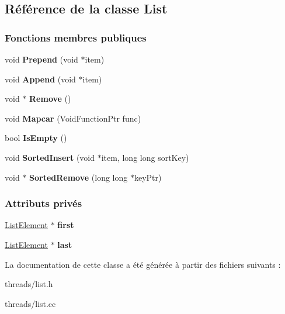 \hypertarget{class_list}{}\subsection{Référence de la classe List}
\label{class_list}
\subsubsection*{Fonctions membres publiques}
\begin{DoxyCompactItemize}
\item 
\hypertarget{class_list_a4058cbcd6b63f741faa40e3d782c28a8}{}\label{class_list_a4058cbcd6b63f741faa40e3d782c28a8} 
void {\bfseries Prepend} (void $\ast$item)
\item 
\hypertarget{class_list_aea4cc7578bb4db7f502dc005e5edc902}{}\label{class_list_aea4cc7578bb4db7f502dc005e5edc902} 
void {\bfseries Append} (void $\ast$item)
\item 
\hypertarget{class_list_a4f804c07c4cfa4c9b631e6e117156e32}{}\label{class_list_a4f804c07c4cfa4c9b631e6e117156e32} 
void $\ast$ {\bfseries Remove} ()
\item 
\hypertarget{class_list_ab57e90b8b2a790db7f2cad1e7aaa72d3}{}\label{class_list_ab57e90b8b2a790db7f2cad1e7aaa72d3} 
void {\bfseries Mapcar} (Void\+Function\+Ptr func)
\item 
\hypertarget{class_list_a854e9656ddbfae181d12f9d9413bc2b8}{}\label{class_list_a854e9656ddbfae181d12f9d9413bc2b8} 
bool {\bfseries Is\+Empty} ()
\item 
\hypertarget{class_list_a7c19a72f21a238bfcad895331f47f97c}{}\label{class_list_a7c19a72f21a238bfcad895331f47f97c} 
void {\bfseries Sorted\+Insert} (void $\ast$item, long long sort\+Key)
\item 
\hypertarget{class_list_aab7a88f9d140ed82a2ed84db03d71f7f}{}\label{class_list_aab7a88f9d140ed82a2ed84db03d71f7f} 
void $\ast$ {\bfseries Sorted\+Remove} (long long $\ast$key\+Ptr)
\end{DoxyCompactItemize}
\subsubsection*{Attributs privés}
\begin{DoxyCompactItemize}
\item 
\hypertarget{class_list_ab6dd52dbb617d263723015ef055caffe}{}\label{class_list_ab6dd52dbb617d263723015ef055caffe} 
\hyperlink{class_list_element}{List\+Element} $\ast$ {\bfseries first}
\item 
\hypertarget{class_list_a8837b9d9e38543326400fc75beb08324}{}\label{class_list_a8837b9d9e38543326400fc75beb08324} 
\hyperlink{class_list_element}{List\+Element} $\ast$ {\bfseries last}
\end{DoxyCompactItemize}


La documentation de cette classe a été générée à partir des fichiers suivants \+:\begin{DoxyCompactItemize}
\item 
threads/list.\+h\item 
threads/list.\+cc\end{DoxyCompactItemize}
